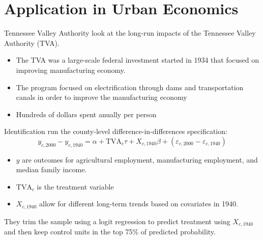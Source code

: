 \documentclass[aspectratio=169]{beamer}
\begin{document}
\section{Application in Urban Economics}

\begin{frame}{Tennessee Valley Authority}
    \citet{Kline_Moretti_2014a} look at the long-run impacts of the Tennessee Valley Authority (TVA).

    \begin{itemize}
        \item The TVA was a large-scale federal investment started in 1934 that focused on improving manufacturing economy.
        
        \item The program focused on electrification through dams and transportation canals in order to improve the manufacturing economy
        
        \item Hundreds of dollars spent anually per person
    \end{itemize}
\end{frame}

\begin{frame}{Identification}
    \citet{Kline_Moretti_2014a} run the county-level difference-in-differences  specification: 
    \begin{equation}\label{eq:tva_spillover}
        y_{c, 2000} - y_{c, 1940} = \alpha + \text{TVA}_c \tau + X_{c, 1940} \beta + (\varepsilon_{c, 2000} - \varepsilon_{c, 1940})
    \end{equation} 

    \begin{itemize}
        \item $y$ are outcomes for agricultural employment, manufacturing employment, and median family income.
        \item $\text{TVA}_c$ is the treatment variable
        \item $X_{c, 1940}$ allow for different long-term trends based on covariates in 1940. 
    \end{itemize}

    They trim the sample using a logit regression to predict treatment using $X_{c,1940}$ and then keep control units in the top 75\% of predicted probability.
\end{frame}
\end{document}
